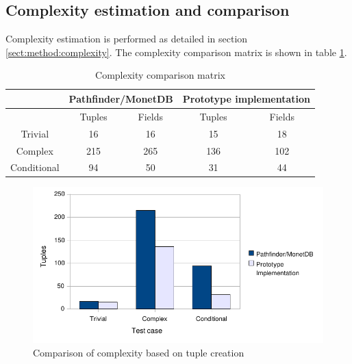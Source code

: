 \newpage
\subsection{Complexity estimation and comparison}
Complexity estimation is performed as detailed in section
\ref{sect:method:complexity}. The complexity
comparison matrix is shown in table \ref{table:result:complexity_matrix}.

\begin{table}[!htp]
 \begin{center} 
 \begin{tabular}{| c | c | c || c | c |}
  \hline
   & \multicolumn{2}{|c||}{\textbf{Pathfinder/MonetDB}}
   & \multicolumn{2}{|c|}{\textbf{Prototype implementation}} \\
   \hline
   & Tuples & Fields & Tuples & Fields \\  
   \hline
   Trivial & 16 & 16 & 15 & 18 \\  
   \hline
   Complex & 215 & 265 & 136 & 102 \\
   \hline
   Conditional & 94 & 50 & 31 & 44 \\  
   \hline
 \end{tabular}
\caption{Complexity comparison matrix}
\label{table:result:complexity_matrix}
 \end{center}
\end{table}




\begin{figure}[!htp]
\begin{center}
  \includegraphics[width=1.0\textwidth]{diagrams/comparison_chart2_chart1}
  \caption{Comparison of complexity based on tuple creation}
  \label{fig:results:comparison:chart1}
\end{center}
\end{figure}

